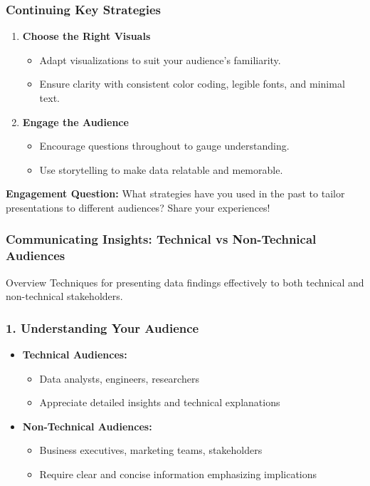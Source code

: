\documentclass{beamer}
\begin{document}
\begin{frame}[fragile]
    \frametitle{Continuing Key Strategies}

    \begin{enumerate}[resume]
        \item \textbf{Choose the Right Visuals}
        \begin{itemize}
            \item Adapt visualizations to suit your audience's familiarity.
            \item Ensure clarity with consistent color coding, legible fonts, and minimal text.
        \end{itemize}
        \item \textbf{Engage the Audience}
        \begin{itemize}
            \item Encourage questions throughout to gauge understanding.
            \item Use storytelling to make data relatable and memorable.
        \end{itemize}
    \end{enumerate}

    \textbf{Engagement Question:}
    What strategies have you used in the past to tailor presentations to different audiences? Share your experiences!
\end{frame}

\begin{frame}[fragile]
    \frametitle{Communicating Insights: Technical vs Non-Technical Audiences}
    \begin{block}{Overview}
        Techniques for presenting data findings effectively to both technical and non-technical stakeholders.
    \end{block}
\end{frame}

\begin{frame}[fragile]
    \frametitle{1. Understanding Your Audience}
    \begin{itemize}
        \item \textbf{Technical Audiences:}
            \begin{itemize}
                \item Data analysts, engineers, researchers
                \item Appreciate detailed insights and technical explanations
            \end{itemize}
        \item \textbf{Non-Technical Audiences:}
            \begin{itemize}
                \item Business executives, marketing teams, stakeholders
                \item Require clear and concise information emphasizing implications
            \end{itemize}
    \end{itemize}
\end{frame}
\end{document}
